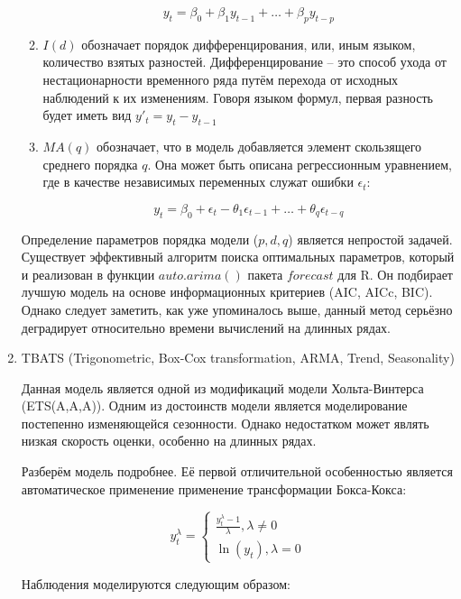 \documentclass[a4paper,12pt]{article}
\begin{document}
\begin{enumerate}
\begin{enumerate}[\Sun]
	 	\[   y_t = \beta_0 + \beta_1 y_{t - 1} + \dots + \beta_p y_{t - p}  \]
	 	
	 	\item $ I(d) $ обозначает порядок дифференцирования, или, иным языком, количество взятых разностей. Дифференцирование -- это способ ухода от нестационарности временного ряда путём перехода от исходных наблюдений к их изменениям. Говоря языком формул, первая разность будет иметь вид $ y'_t = y_t - y_{t - 1} $
	 	
	 	\item $ MA(q) $ обозначает, что в модель добавляется элемент скользящего среднего порядка $ q $. Она может быть описана регрессионным уравнением, где в качестве независимых переменных служат ошибки $ \epsilon_t $:
	 	
	 	\[ y_t = \beta_0 + \epsilon_t - \theta_1 \epsilon_{t - 1}  + \dots + \theta_{q} \epsilon_{t - q}\]
	 \end{enumerate}
 
 Определение параметров порядка модели ($ p, d, q $) является непростой задачей. Существует эффективный алгоритм поиска оптимальных параметров, который и реализован в функции $ auto.arima() $ пакета $ forecast $ для R. Он подбирает лучшую модель на основе информационных критериев (AIC, AICc, BIC). \cite{arima}  Однако следует заметить, как уже упоминалось выше, данный метод серьёзно деградирует относительно времени вычислений на длинных рядах.
 
 \item TBATS (Trigonometric, Box-Cox transformation, ARMA, Trend, Seasonality)
 
 Данная модель является одной из модификаций модели Хольта-Винтерса (ETS(A,A,A)). Одним из достоинств модели является моделирование постепенно изменяющейся сезонности. Однако недостатком может являть низкая скорость оценки, особенно на длинных рядах.
 
 Разберём модель подробнее. Её первой отличительной особенностью является автоматическое применение применение трансформации Бокса-Кокса:
 
 \begin{equation*}
 	y_t^\lambda = 
 	\begin{cases}
 	\frac{y_t^\lambda - 1}{\lambda}, \lambda \neq 0\\
 	\ln(y_t), \lambda = 0
 	\end{cases}
 \end{equation*}
 
 Наблюдения моделируются следующим образом:
 

\end{enumerate}
\end{document}
